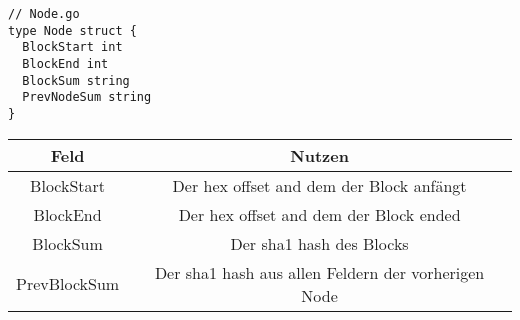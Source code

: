 \begin{verbatim}
// Node.go
type Node struct {
  BlockStart int
  BlockEnd int
  BlockSum string
  PrevNodeSum string
}
\end{verbatim}

\begin{center}
  \begin{tabular}{|c | c|}
    \hline
    Feld & Nutzen \\ [0.5ex]
    \hline
    BlockStart & Der hex offset and dem der Block anfängt \\
    \hline
    BlockEnd & Der hex offset and dem der Block ended \\
    \hline
    BlockSum & Der sha1 hash des Blocks \\
    \hline
    PrevBlockSum & Der sha1 hash aus allen Feldern der vorherigen Node \\
    \hline
  \end{tabular}
\end{center}

